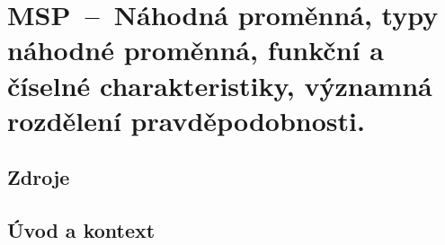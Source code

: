

\graphicspath{{msp/nahodna_promenna/figures}}


\chapter{MSP~--~Náhodná proměnná, typy náhodné proměnná, funkční a číselné charakteristiky, významná rozdělení pravděpodobnosti.}


\section{Zdroje}

\begin{compactitem}
    \item {}
\end{compactitem}


\section{Úvod a kontext}

